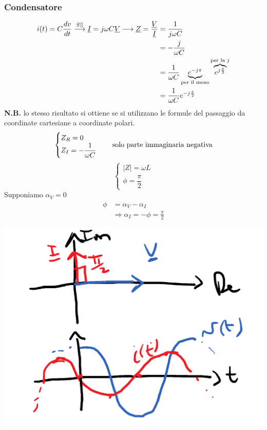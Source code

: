 \documentclass{article}
\begin{document}
\subsubsection*{Condensatore}
\begin{align*}
    i(t)=C \frac{dv}{dt} \overset{S[]}{\longrightarrow} \underline{I} = j \omega C \underline{V} \longrightarrow \underline{Z} = \frac{\underline{V}}{\underline{I}} &= \frac{1}{j \omega C}\\
    &= -\frac{j}{\omega C} \\
    &=\frac{1}{\omega C} \underbrace{e^{-j \pi}}_{\text{per il meno}} \overbrace{e^{j \frac{\pi}{2}}}^{\text{per la }j} \\
    &= \frac{1}{\omega C}e^{-j \frac{\pi}{2}}
\end{align*}
\textbf{N.B.} lo stesso risultato si ottiene se si utilizzano le formule del passaggio da coordinate cartesiane a coordinate polari.
\[
    \begin{cases}
        Z_R=0\\
        Z_I= - \dfrac{1}{\omega C}
    \end{cases}
    \ \ \ \text{solo parte immaginaria negativa}
\]
\[
    \begin{cases}
        |Z|=\omega L\\
        \phi = \dfrac{\pi}{2}
    \end{cases}
\]
Supponiamo $\alpha_V=0$
\begin{align*}
    \phi &= \alpha_V - \alpha_I \\
    &\Longrightarrow \alpha_I = - \phi = \frac{\pi}{2}
\end{align*}
\begin{center}
    \includegraphics[scale=0.22]{Image/Regime_sinusoidale_9.png}
\end{center}
\end{document}
